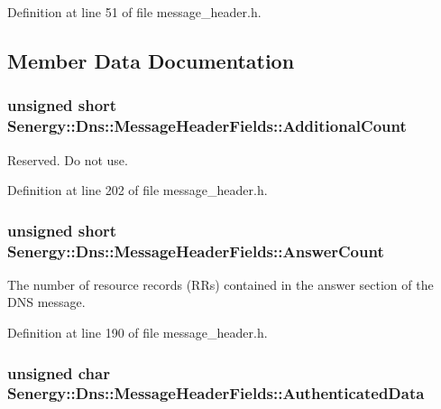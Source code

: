 Definition at line 51 of file message\-\_\-header.\-h.



\subsection{Member Data Documentation}
\hypertarget{struct_senergy_1_1_dns_1_1_message_header_fields_aae6ba21a1c8baa30f0aafe90d165420f}{
\subsubsection[{Additional\-Count}]{\setlength{\rightskip}{0pt plus 5cm}unsigned short Senergy\-::\-Dns\-::\-Message\-Header\-Fields\-::\-Additional\-Count}}\label{struct_senergy_1_1_dns_1_1_message_header_fields_aae6ba21a1c8baa30f0aafe90d165420f}


Reserved. Do not use. 



Definition at line 202 of file message\-\_\-header.\-h.

\hypertarget{struct_senergy_1_1_dns_1_1_message_header_fields_a38e5101ec862c400628d66192c5b9878}{
\subsubsection[{Answer\-Count}]{\setlength{\rightskip}{0pt plus 5cm}unsigned short Senergy\-::\-Dns\-::\-Message\-Header\-Fields\-::\-Answer\-Count}}\label{struct_senergy_1_1_dns_1_1_message_header_fields_a38e5101ec862c400628d66192c5b9878}


The number of resource records (R\-Rs) contained in the answer section of the D\-N\-S message. 



Definition at line 190 of file message\-\_\-header.\-h.

\hypertarget{struct_senergy_1_1_dns_1_1_message_header_fields_a3788cbe9e2663b3be0cad8cbca8dc985}{
\subsubsection[{Authenticated\-Data}]{\setlength{\rightskip}{0pt plus 5cm}unsigned char Senergy\-::\-Dns\-::\-Message\-Header\-Fields\-::\-Authenticated\-Data}}\label{struct_senergy_1_1_dns_1_1_message_header_fields_a3788cbe9e2663b3be0cad8cbca8dc985}


